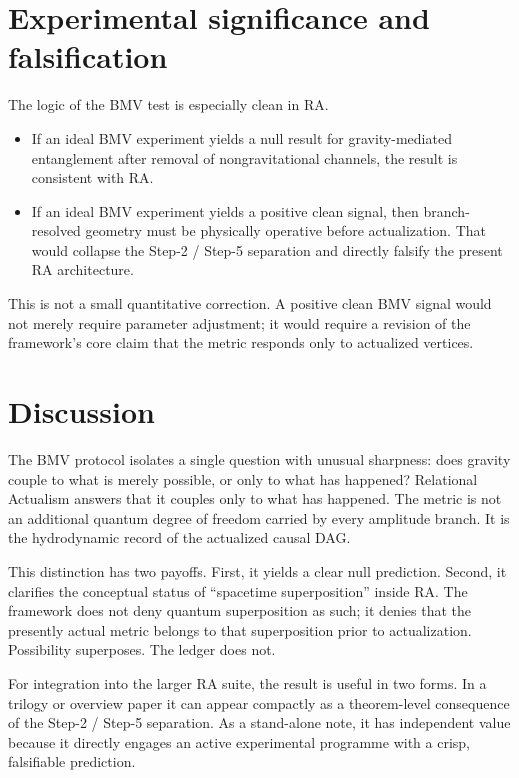 \documentclass[11pt]{article}
\begin{document}
\section{Experimental significance and falsification}

The logic of the BMV test is especially clean in RA.

\begin{itemize}[leftmargin=2em]
    \item If an ideal BMV experiment yields a null result for gravity-mediated entanglement after removal of nongravitational channels, the result is consistent with RA.
    \item If an ideal BMV experiment yields a positive clean signal, then branch-resolved geometry must be physically operative before actualization. That would collapse the Step-2 / Step-5 separation and directly falsify the present RA architecture.
\end{itemize}

This is not a small quantitative correction. A positive clean BMV signal would not merely require parameter adjustment; it would require a revision of the framework's core claim that the metric responds only to actualized vertices.

\section{Discussion}

The BMV protocol isolates a single question with unusual sharpness: does gravity couple to what is merely possible, or only to what has happened? Relational Actualism answers that it couples only to what has happened. The metric is not an additional quantum degree of freedom carried by every amplitude branch. It is the hydrodynamic record of the actualized causal DAG.

This distinction has two payoffs. First, it yields a clear null prediction. Second, it clarifies the conceptual status of ``spacetime superposition'' inside RA. The framework does not deny quantum superposition as such; it denies that the presently actual metric belongs to that superposition prior to actualization. Possibility superposes. The ledger does not.

For integration into the larger RA suite, the result is useful in two forms. In a trilogy or overview paper it can appear compactly as a theorem-level consequence of the Step-2 / Step-5 separation. As a stand-alone note, it has independent value because it directly engages an active experimental programme with a crisp, falsifiable prediction.
\end{document}
